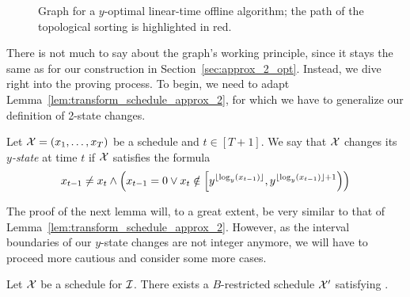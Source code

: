 \begin{figure}[ht]

\caption{Graph for a $y$-optimal linear-time offline algorithm; the path of the topological sorting is highlighted in red.}
\label{fig:graph_lin_approx_y}
\end{figure}
There is not much to say about the graph's working principle, since it stays the same as for our construction in Section~\ref{sec:approx_2_opt}. Instead, we dive right into the proving process. To begin, we need to adapt Lemma~\ref{lem:transform_schedule_approx_2}, for which we have to generalize our definition of 2-state changes.
\begin{defn}\label{defn:y_state_changes}
Let $\mathcal{X}=(x_1,\dotsc,x_T)$ be a schedule and $t\in[T+1]$. We say that $\mathcal{X}$ changes its \emph{$y$-state} at time $t$ if $\mathcal{X}$ satisfies the formula
\begin{equation*}
	x_{t-1}\neq x_t\land \left(x_{t-1}=0 \lor x_t\notin\left[y^{\lfloor\log_y(x_{t-1})\rfloor},y^{\lfloor\log_y(x_{t-1})\rfloor+1}\right)\right)
\end{equation*}
\end{defn}
The proof of the next lemma will, to a great extent, be very similar to that of Lemma~\ref{lem:transform_schedule_approx_2}. However, as the interval boundaries of our $y$-state changes are not integer anymore, we will have to proceed more cautious and consider some more cases.
\begin{lem}
Let $\mathcal{X}$ be a schedule for $\mathcal{I}$. There exists a $B$-restricted schedule $\mathcal{X}'$ satisfying .
\end{lem}
